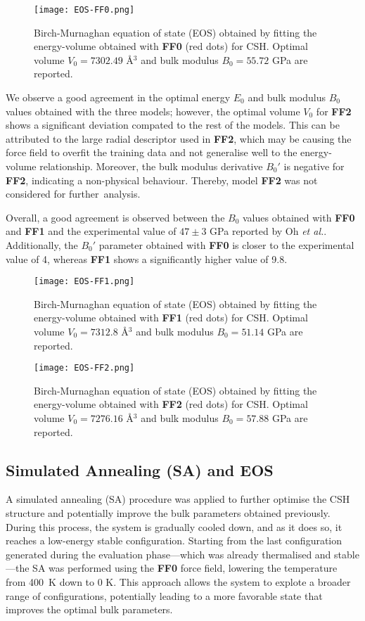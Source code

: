 \begin{figure}[h!]
    \centering
    \texttt{[image: EOS-FF0.png]}
    \caption{Birch-Murnaghan equation of state (EOS) obtained by fitting the energy-volume obtained with \textbf{FF0} (red dots) for CSH. Optimal volume $V_0=7302.49$ \AA$^3$ and bulk modulus $B_0=55.72$ GPa are reported.
    }
    \label{fig:eos-ff0}
\end{figure}

We observe a good agreement in the optimal energy $E_0$ and bulk modulus $B_0$ values obtained with the three models; however, the optimal volume $V_0$ for \textbf{FF2} shows a significant deviation compated to the rest of the models. This can be attributed to the large radial descriptor used in \textbf{FF2}, which may be causing the force field to overfit the training data and not generalise well to the energy-volume relationship. Moreover, the bulk modulus derivative $B_0'$ is negative for \textbf{FF2}, indicating a non-physical behaviour. Thereby, model \textbf{FF2} was not considered for further~analysis. 

Overall, a good agreement is observed between the $B_0$ values obtained with \textbf{FF0} and \textbf{FF1} and the experimental value of $47\pm 3$ GPa reported by Oh \emph{et al.}\supercite{Oh2012}. Additionally, the $B_0'$ parameter obtained with \textbf{FF0} is closer to the experimental value of 4\supercite{Oh2012}, whereas \textbf{FF1} shows a significantly higher value of 9.8. 
\begin{figure}[h!]
    \centering
    \texttt{[image: EOS-FF1.png]}
    \caption{
    Birch-Murnaghan equation of state (EOS) obtained by fitting the energy-volume obtained with \textbf{FF1} (red dots) for CSH. Optimal volume $V_0=7312.8$ \AA$^3$ and bulk modulus $B_0=51.14$ GPa are reported.
    }
    \label{fig:eos-ff1}
\end{figure}
\begin{figure}[H]
    \centering
    \texttt{[image: EOS-FF2.png]}
    \caption{
    Birch-Murnaghan equation of state (EOS) obtained by fitting the energy-volume obtained with \textbf{FF2} (red dots) for CSH. Optimal volume $V_0=7276.16$ \AA$^3$ and bulk modulus $B_0=57.88$ GPa are reported.}
    \label{fig:eos-ff2}
\end{figure}

\subsection{Simulated Annealing (SA) and EOS}
A simulated annealing (SA) procedure was applied to further optimise the CSH structure and potentially improve the bulk parameters obtained previously. During this process, the system is gradually cooled down, and as it does so, it reaches a low-energy stable configuration. Starting from the last configuration generated during the evaluation phase---which was already thermalised and stable---the SA was performed using the \textbf{FF0} force field, lowering the temperature from 400~K down to 0 K. This approach allows the system to explote a broader range of configurations, potentially leading to a more favorable state that improves the optimal bulk parameters.


